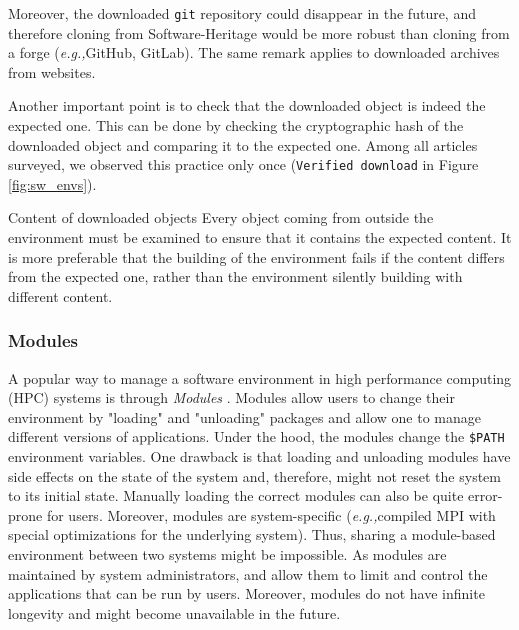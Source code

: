 \documentclass[sigconf,natbib=false]{acmart}
\newcommand{\eg}{\emph{e.g.,}}
\newcommand{\todo}[1]{{\color{red}{TODO: #1}}}
\begin{document}
Moreover, the downloaded \texttt{git} repository could disappear in the future, and therefore cloning from Software-Heritage would be more robust than cloning from a forge (\eg GitHub, GitLab).
The same remark applies to downloaded archives from websites.

Another important point is to check that the downloaded object is indeed the expected one.
This can be done by checking the cryptographic hash of the downloaded object and comparing it to the expected one.
Among all articles surveyed, we observed this practice only once (\texttt{Verified download} in Figure \ref{fig:sw_envs}).

\begin{lesson}{Content of downloaded objects}{}
Every object coming from outside the environment must be examined to ensure that it contains the expected content.
It is more preferable that the building of the environment fails if the content differs from the expected one, rather than the environment silently building with different content.
\end{lesson}

\subsubsection{Modules}

A popular way to manage a software environment in high performance computing (HPC) systems is through \emph{Modules} \cite{furlani1991modules, modules}.
Modules allow users to change their environment by "loading" and "unloading" packages and allow one to manage different versions of applications. 
Under the hood, the modules change the \texttt{\$PATH} environment variables.
One drawback is that loading and unloading modules have side effects on the state of the system and, therefore, might not reset the system to its initial state.
Manually loading the correct modules can also be quite error-prone for users.
Moreover, modules are system-specific (\eg compiled MPI with special optimizations for the underlying system).
Thus, sharing a module-based environment between two systems might be impossible.
As modules are maintained by system administrators, and allow them to limit and control the applications that can be run by users.
Moreover, modules do not have infinite longevity and might become unavailable in the future.
\end{document}
